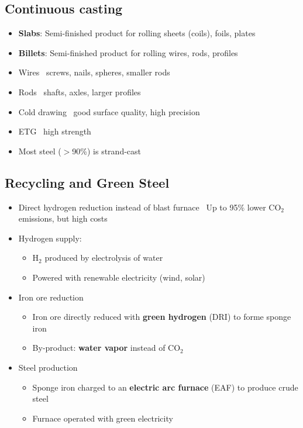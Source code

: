 \documentclass{article}
\begin{document}
\subsection{Continuous casting}
\begin{itemize}
  \item \textbf{Slabs}: Semi-finished product for rolling sheets (coils), foils, plates
  \item \textbf{Billets}: Semi-finished product for rolling wires, rods, profiles
  \item Wires \textrightarrow\ screws, nails, spheres, smaller rods
  \item Rods \textrightarrow\ shafts, axles, larger profiles
  \item Cold drawing \textrightarrow\ good surface quality, high precision
  \item ETG \textrightarrow\ high strength
  \item Most steel ($>$90\%) is strand-cast
\end{itemize}

\subsection{Recycling and Green Steel}
\begin{itemize}
  \item Direct hydrogen reduction instead of blast furnace \textrightarrow\ Up to 95\% lower CO$_2$ emissions, but high costs
  \item Hydrogen supply:
  \begin{itemize}
    \item H$_2$ produced by electrolysis of water
    \item Powered with renewable electricity (wind, solar)
  \end{itemize}
  \item Iron ore reduction
  \begin{itemize}
    \item Iron ore directly reduced with \textbf{green hydrogen} (DRI) to forme sponge iron
    \item By-product: \textbf{water vapor} instead of CO$_2$
  \end{itemize}
  \item Steel production
  \begin{itemize}
    \item Sponge iron charged to an \textbf{electric arc furnace} (EAF) to produce crude steel
    \item Furnace operated with green electricity
  \end{itemize}
\end{itemize}
\end{document}
